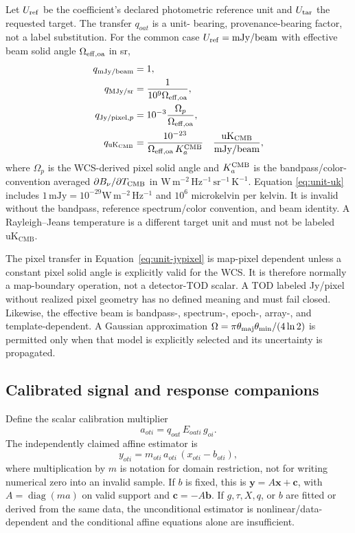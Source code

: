 \documentclass[11pt]{article}
\newcommand{\diag}{\operatorname{diag}}
\begin{document}
Let \(U_{\rm ref}\) be the coefficient's declared photometric reference unit
and \(U_{\rm tar}\) the requested target.  The transfer \(q_{oat}\) is a unit-
bearing, provenance-bearing factor, not a label substitution.  For the common
case \(U_{\rm ref}=\mathrm{mJy/beam}\) with effective beam solid angle
\(\Omega_{\rm eff,oa}\) in sr,
\begin{align}
q_{\mathrm{mJy/beam}} &= 1,
\label{eq:unit-mjybeam}\\
q_{\mathrm{MJy/sr}} &= \frac{1}{10^{9}\Omega_{\rm eff,oa}},
\label{eq:unit-mjysr}\\
q_{\mathrm{Jy/pixel},p} &= 10^{-3}
     \frac{\Omega_{p}}{\Omega_{\rm eff,oa}},
\label{eq:unit-jypixel}\\
q_{\mathrm{uK_{CMB}}} &=
 \frac{10^{-23}}
 {\Omega_{\rm eff,oa}\,K_{a}^{\rm CMB}}
 \quad \frac{\mathrm{uK_{CMB}}}{\mathrm{mJy/beam}},
\label{eq:unit-uk}
\end{align}
where \(\Omega_p\) is the WCS-derived pixel solid angle and
\(K_a^{\rm CMB}\) is the bandpass/color-convention averaged
\(\partial B_\nu/\partial T_{\rm CMB}\) in
\(\mathrm{W\,m^{-2}\,Hz^{-1}\,sr^{-1}\,K^{-1}}\).  Equation
\eqref{eq:unit-uk} includes \(1\,\mathrm{mJy}=10^{-29}
\mathrm{W\,m^{-2}\,Hz^{-1}}\) and \(10^6\) microkelvin per kelvin.
It is invalid without the bandpass, reference spectrum/color convention, and
beam identity.  A Rayleigh--Jeans temperature is a different target unit and
must not be labeled \(\mathrm{uK_{CMB}}\).

The pixel transfer in Equation~\eqref{eq:unit-jypixel} is map-pixel dependent
unless a constant pixel solid angle is explicitly valid for the WCS.  It is
therefore normally a map-boundary operation, not a detector-TOD scalar.  A TOD
labeled Jy/pixel without realized pixel geometry has no defined meaning and
must fail closed.  Likewise, the effective beam is bandpass-, spectrum-,
epoch-, array-, and template-dependent.  A Gaussian approximation
\(\Omega=\pi\theta_{\rm maj}\theta_{\rm min}/(4\ln2)\) is permitted only when
that model is explicitly selected and its uncertainty is propagated.

\subsection{Calibrated signal and response companions}

Define the scalar calibration multiplier
\begin{equation}
  a_{oti}=q_{oat}\,E_{oati}\,g_{oi}.
  \label{eq:multiplier}
\end{equation}
The independently claimed affine estimator is
\begin{equation}
  y_{oti}=m_{oti}\,a_{oti}\,(x_{oti}-b_{oti}),
  \label{eq:signal-estimator}
\end{equation}
where multiplication by \(m\) is notation for domain restriction, not for
writing numerical zero into an invalid sample.  If \(b\) is fixed, this is
\(\boldsymbol y=A\boldsymbol x+\boldsymbol c\), with
\(A=\diag(m a)\) on valid support and
\(\boldsymbol c=-A\boldsymbol b\).  If \(g,\tau,X,q\), or \(b\) are fitted or
derived from the same data, the unconditional estimator is nonlinear/data-
dependent and the conditional affine equations alone are insufficient.
\end{document}
